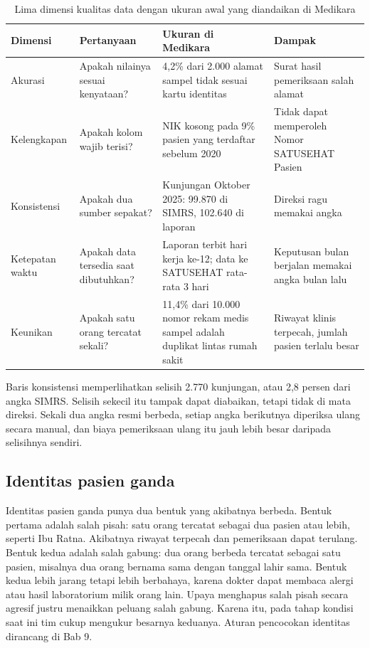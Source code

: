 \begin{table}[!htb]
  \centering
  \caption{Lima dimensi kualitas data dengan ukuran awal yang diandaikan di
           Medikara}
  \label{tab:ch06-kualitas}
  \begin{tabularx}{\textwidth}{lXXX}
    \hline
    \textbf{Dimensi} & \textbf{Pertanyaan} & \textbf{Ukuran di Medikara} &
      \textbf{Dampak} \\
    \hline
    Akurasi & Apakah nilainya sesuai kenyataan? & 4,2\% dari 2.000 alamat
      sampel tidak sesuai kartu identitas & Surat hasil pemeriksaan salah
      alamat \\
    \hline
    Kelengkapan & Apakah kolom wajib terisi? & NIK kosong pada 9\% pasien yang
      terdaftar sebelum 2020 & Tidak dapat memperoleh Nomor SATUSEHAT Pasien \\
    \hline
    Konsistensi & Apakah dua sumber sepakat? & Kunjungan Oktober 2025: 99.870
      di SIMRS, 102.640 di laporan & Direksi ragu memakai angka \\
    \hline
    Ketepatan waktu & Apakah data tersedia saat dibutuhkan? & Laporan terbit
      hari kerja ke-12; data ke SATUSEHAT rata-rata 3 hari & Keputusan bulan
      berjalan memakai angka bulan lalu \\
    \hline
    Keunikan & Apakah satu orang tercatat sekali? & 11,4\% dari 10.000 nomor
      rekam medis sampel adalah duplikat lintas rumah sakit & Riwayat klinis
      terpecah, jumlah pasien terlalu besar \\
    \hline
  \end{tabularx}
\end{table}

Baris konsistensi memperlihatkan selisih 2.770 kunjungan, atau 2,8 persen dari
angka SIMRS. Selisih sekecil itu tampak dapat diabaikan, tetapi tidak di
mata direksi. Sekali dua angka resmi berbeda, setiap angka berikutnya
diperiksa ulang secara manual, dan biaya pemeriksaan ulang itu jauh lebih
besar daripada selisihnya sendiri.

\subsection*{Identitas pasien ganda}

Identitas pasien ganda punya dua bentuk yang akibatnya berbeda. Bentuk pertama
adalah salah pisah: satu orang tercatat sebagai dua pasien atau lebih, seperti
Ibu Ratna. Akibatnya riwayat terpecah dan pemeriksaan dapat terulang. Bentuk
kedua adalah salah gabung: dua orang berbeda tercatat sebagai satu pasien,
misalnya dua orang bernama sama dengan tanggal lahir sama. Bentuk kedua lebih
jarang tetapi lebih berbahaya, karena dokter dapat membaca alergi atau hasil
laboratorium milik orang lain. Upaya menghapus salah pisah secara agresif
justru menaikkan peluang salah gabung. Karena itu, pada tahap kondisi saat ini
tim cukup mengukur besarnya keduanya. Aturan pencocokan identitas dirancang di
Bab 9.

